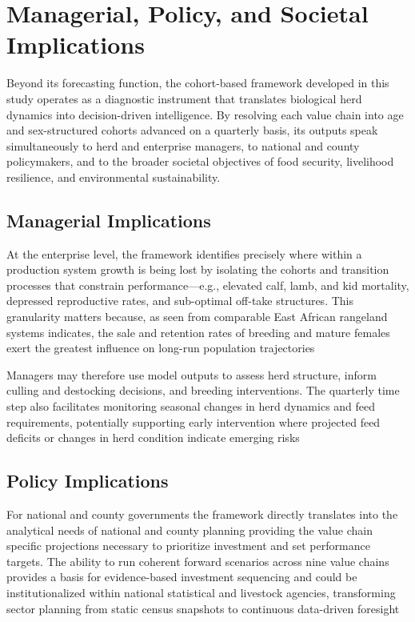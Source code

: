 \section{Managerial, Policy, and Societal Implications}

Beyond its forecasting function, the cohort-based framework developed in this study operates as a diagnostic instrument that translates biological herd dynamics into decision-driven intelligence. By resolving each value chain into age and sex-structured cohorts advanced on a quarterly basis, its outputs speak simultaneously to herd and enterprise managers, to national and county policymakers, and to the broader societal objectives of food security, livelihood resilience, and environmental sustainability.

\subsection{Managerial Implications}
At the enterprise level, the framework identifies precisely where within a production system growth is being lost by isolating the cohorts and transition processes that constrain performance---e.g., elevated calf, lamb, and kid mortality, depressed reproductive rates, and sub-optimal off-take structures. This granularity matters because, as seen from comparable East African rangeland systems indicates, the sale and retention rates of breeding and mature females exert the greatest influence on long-run population trajectories %

Managers may therefore use model outputs to assess herd structure, inform culling and destocking decisions, and breeding interventions. The quarterly time step also facilitates monitoring seasonal changes in herd dynamics and feed requirements, potentially supporting early intervention where projected feed deficits or changes in herd condition indicate emerging risks %

\subsection{Policy Implications}
For national and county governments the framework directly translates into the analytical needs of national and county planning providing the value chain specific projections necessary to prioritize investment and set performance targets. The ability to run coherent forward scenarios across nine value chains provides a basis for evidence-based investment sequencing and could be institutionalized within national statistical and livestock agencies, transforming sector planning from static census snapshots to continuous data-driven foresight %

